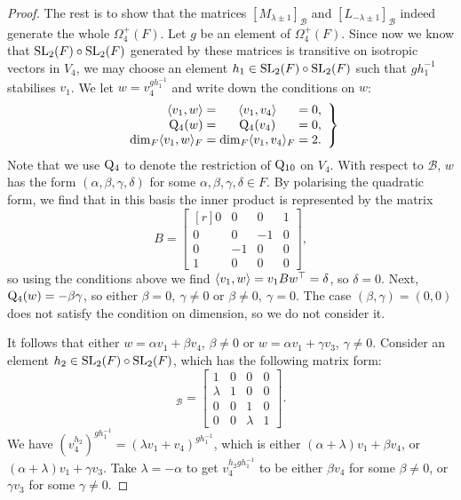 \begin{proof}
	The rest is to show that the matrices $[M_{\lambda \pm 1}]_{\mathcal{B}}$ and $[L_{- \lambda  \pm 1}]_{\mathcal{B}}$ indeed generate 
	the whole $\Omega_{4}^+(F)$. Let $g$ be an element of $\Omega_4^+(F)$. Since now we know that 
\mbox{$\mathrm{SL}_2(F) \circ \mathrm{SL}_2(F)$} generated by
	these matrices is transitive on isotropic vectors in $V_4$, we may choose an element $h_1 \in \mathrm{SL}_2(F) \circ \mathrm{SL}_2(F)$ such that 
	$g h_1^{-1}$ stabilises $v_1$. We let $w = v_4^{g h_1^{-1}}$ and write down the conditions on $w$:
	\begin{equation*}
		\left.
		\begin{array}{r@{\;}c@{\;}c@{\;}c@{\;}l}
			\inner{v_1}{w} & = & \inner{v_1}{v_4} & = & 0, \\
			\QQ_4(w) & = & \QQ_4(v_4) & = & 0, \\
			\dim_F \inner{v_1}{w}_F & = & \dim_F \inner{v_1}{v_4}_F & = & 2.
		\end{array}
		\right\}
	\end{equation*}
	Note that we use $\mathord{\mathrm{Q}}_4$ to 
	denote the restriction of $\mathord{\mathrm{Q}}_{10}$ on $V_4$. With respect to $\mathcal{B}$, $w$ has the 
	form $(\alpha, \beta, \gamma, \delta)$ for some $\alpha,\beta,\gamma,\delta \in F$.
	By polarising the quadratic form, we find that in this basis the inner product is 
	represented by the matrix
	\begin{equation*}
		B = \begin{bmatrix}[r]
			0 & 0 & 0 & 1 \\
			0 & 0 & -1 & 0 \\
			0 & -1 & 0 & 0 \\
			1 & 0 & 0 & 0
		\end{bmatrix},
	\end{equation*}
	so using the conditions above we find $\langle v_1, w \rangle = v_1 B w^{\top} = \delta$, so $\delta = 0$. Next, 
	$\mathord{\mathrm{Q}}_4(w) = -\beta \gamma$, so either $\beta = 0,\ \gamma \neq 0$ or $\beta \neq 0,\ \gamma = 0$. The 
	case $(\beta, \gamma) = (0,0)$ does not satisfy the condition on dimension, so we do not consider it. 
	
	It follows that either $w = \alpha v_1 + \beta v_4$, $\beta \neq 0$ or $w = \alpha v_1 + \gamma v_3$, $\gamma \neq 0$. 
	Consider an element $h_2 \in \mathrm{SL}_2(F) \circ \mathrm{SL}_2(F)$, which has the following matrix form:
	\begin{equation*}
		[h_2]_{\mathcal{B}} = 
		\begin{bmatrix}
			1 & 0 & 0 & 0 \\
			\lambda & 1 & 0 & 0 \\
			0 & 0 & 1 & 0 \\
			0 & 0 & \lambda & 1
		\end{bmatrix}.
	\end{equation*}
	We have $(v_4^{h_2})^{g h_1^{-1}} = (\lambda v_1 + v_4)^{g h_1^{-1}}$, which is either $(\alpha + \lambda) v_1 + \beta v_4$, or 
	$(\alpha + \lambda) v_1 + \gamma v_3$. Take $\lambda = -\alpha$ to get $v_4^{h_2 g h_1^{-1}}$ to be either 
	$\beta v_4$ for some $\beta \neq 0$, or $\gamma v_3$ for some $\gamma \neq 0$. 
	

\end{proof}
